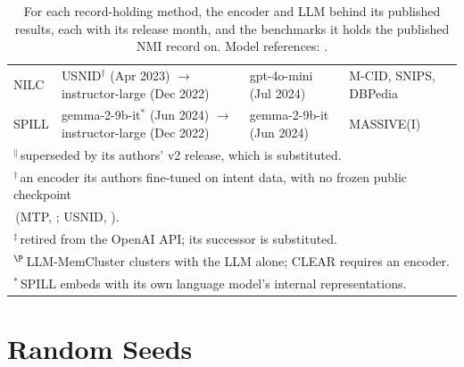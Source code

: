 \documentclass[11pt,a4paper,oneside]{report}
\begin{document}
\begin{table}[htbp]
\begin{tabularx}{\textwidth}{lll>{\raggedright\arraybackslash}X}
\addlinespace[2pt]
NILC & \makecell{{\footnotesize\ttfamily USNID}$^{\dagger}$ {\footnotesize(Apr 2023)} \\ $\to$ {\footnotesize\ttfamily instructor-large} {\footnotesize(Dec 2022)}} & {\footnotesize\ttfamily gpt-4o-mini} {\footnotesize(Jul 2024)} & M-CID, SNIPS, DBPedia \\
\addlinespace[2pt]
SPILL & \makecell{{\footnotesize\ttfamily gemma-2-9b-it}$^{*}$ {\footnotesize(Jun 2024)} \\ $\to$ {\footnotesize\ttfamily instructor-large} {\footnotesize(Dec 2022)}} & {\footnotesize\ttfamily gemma-2-9b-it} {\footnotesize(Jun 2024)} & MASSIVE(I) \\
\bottomrule
\multicolumn{4}{l}{\footnotesize $^{\|}$\,superseded by its authors' v2 release, which is substituted.} \\
\multicolumn{4}{l}{\footnotesize $^{\dagger}$\,an encoder its authors fine-tuned on intent data, with no frozen public checkpoint} \\
\multicolumn{4}{l}{\footnotesize \phantom{$^{\dagger}$}\,({\footnotesize\ttfamily MTP}, \citealp{zhang2022mtpclnn}; {\footnotesize\ttfamily USNID}, \citealp{zhang2024usnid}).} \\
\multicolumn{4}{l}{\footnotesize $^{\ddagger}$\,retired from the OpenAI API; its successor is substituted.} \\
\multicolumn{4}{l}{\footnotesize $^{\P}$\,LLM-MemCluster clusters with the LLM alone; CLEAR requires an encoder.} \\
\multicolumn{4}{l}{\footnotesize $^{*}$\,SPILL embeds with its own language model's internal representations.} \\
\end{tabularx}
\caption[Matched encoder and LLM per record holder]{For each record-holding method, the encoder and LLM behind its published results, each with its release month, and the benchmarks it holds the published NMI record on. Model references: \citealp{su2023instructor,wang2022e5,reimers2019sbert,openai2024embeddings,lee2025gemini,gemmateam2024gemma2,zhang2022mtpclnn,zhang2024usnid,ouyang2022instructgpt,openai2023gpt35,openai2024gpt4o,openai2025gpt41}.}
\label{tab:rq4-sota-stacks}
\end{table}

\FloatBarrier

\section{Random Seeds}\label{app:seeds}
\end{document}
